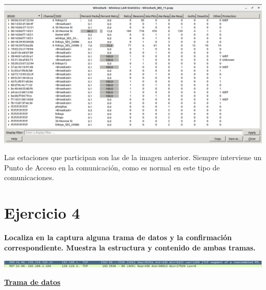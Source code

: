 \documentclass{article}
\begin{document}
\begin{center}
\includegraphics[scale=0.3]{WLAN/BSSID.png}
\end{center}

Las estaciones que participan son las de la imagen anterior. Siempre interviene un Punto de Acceso en la comunicación, como es normal en este tipo de comunicaciones.

\section{Ejercicio 4}

\textbf{Localiza en la captura alguna trama de datos y la confirmación correspondiente.
Muestra la estructura y contenido de ambas tramas.}

\begin{center}
\includegraphics[scale=0.3]{WLAN/tramatcp.png}
\end{center}

\textbf{\underline{Trama de datos}}
\end{document}
